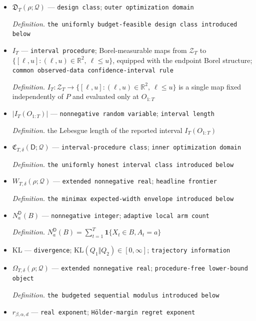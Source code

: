 \documentclass{article}
\begin{document}
\begin{itemize}
  \item \(\mathfrak D_T(\rho;\mathcal Q)\) --- \texttt{design class}; \texttt{outer optimization domain}
  \par\smallskip\noindent\emph{Definition.} \texttt{the uniformly budget-\allowbreak{}feasible design class introduced below}
  \item \(I_T\) --- \texttt{interval procedure}; Borel-measurable maps from \(\mathcal Z_T\) to \(\{[\ell,u]:(\ell,u)\in\mathbb R^2,\ \ell\le u\}\), equipped with the endpoint Borel structure; \texttt{common observed-\allowbreak{}data confidence-\allowbreak{}interval rule}
  \par\smallskip\noindent\emph{Definition.} \(I_T:\mathcal Z_T\to\{[\ell,u]:(\ell,u)\in\mathbb R^2,\ \ell\le u\}\) is a single map fixed independently of \(P\) and evaluated only at \(O_{1:T}\)
  \item \(|I_T(O_{1:T})|\) --- \texttt{nonnegative random variable}; \texttt{interval length}
  \par\smallskip\noindent\emph{Definition.} the Lebesgue length of the reported interval \(I_T(O_{1:T})\)
  \item \(\mathfrak C_{T,\delta}(\mathsf D;\mathcal Q)\) --- \texttt{interval-\allowbreak{}procedure class}; \texttt{inner optimization domain}
  \par\smallskip\noindent\emph{Definition.} \texttt{the uniformly honest interval class introduced below}
  \item \(W_{T,\delta}(\rho;\mathcal Q)\) --- \texttt{extended nonnegative real}; \texttt{headline frontier}
  \par\smallskip\noindent\emph{Definition.} \texttt{the minimax expected-\allowbreak{}width envelope introduced below}
  \item \(N_a^{\mathsf D}(B)\) --- \texttt{nonnegative integer}; \texttt{adaptive local arm count}
  \par\smallskip\noindent\emph{Definition.} \(N_a^{\mathsf D}(B)=\sum_{t=1}^T\mathbf 1\{X_t\in B,A_t=a\}\)
  \item \(\mathrm{KL}\) --- \texttt{divergence}; \(\mathrm{KL}(Q_1\Vert Q_2)\in[0,\infty]\); \texttt{trajectory information}
  \item \(\Omega_{T,\delta}(\rho;\mathcal Q)\) --- \texttt{extended nonnegative real}; \texttt{procedure-\allowbreak{}free lower-\allowbreak{}bound object}
  \par\smallskip\noindent\emph{Definition.} \texttt{the budgeted sequential modulus introduced below}
  \item \(r_{\beta,\alpha,d}\) --- \texttt{real exponent}; \texttt{Hölder-\allowbreak{}margin regret exponent}

\end{itemize}
\end{document}

